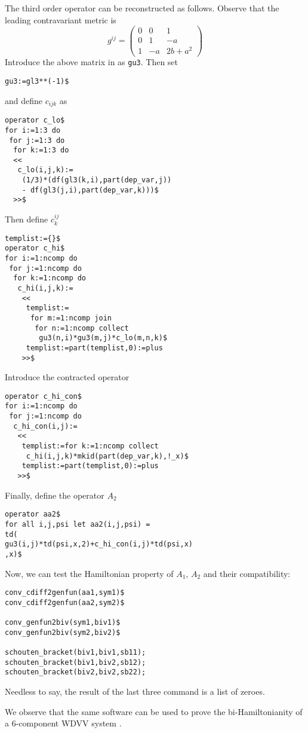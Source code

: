 The third order operator can be reconstructed as follows.
Observe that the leading contravariant metric is
\begin{displaymath}
  g^{ij}=
  \begin{pmatrix}
    0 & 0 & 1
    \\
    0 & 1 & -a
    \\
    1 & -a & 2b+a^2
  \end{pmatrix}
\end{displaymath}
Introduce the above matrix in \REDUCE as \texttt{gu3}. Then set
\begin{verbatim}
gu3:=gl3**(-1)$
\end{verbatim}
and define $c_{ijk}$ as
\begin{verbatim}
operator c_lo$
for i:=1:3 do
 for j:=1:3 do
  for k:=1:3 do
  <<
   c_lo(i,j,k):=
    (1/3)*(df(gl3(k,i),part(dep_var,j))
    - df(gl3(j,i),part(dep_var,k)))$
  >>$
\end{verbatim}
Then define $c^{ij}_k$
\begin{verbatim}
templist:={}$
operator c_hi$
for i:=1:ncomp do
 for j:=1:ncomp do
  for k:=1:ncomp do
   c_hi(i,j,k):=
    <<
     templist:=
      for m:=1:ncomp join
       for n:=1:ncomp collect
        gu3(n,i)*gu3(m,j)*c_lo(m,n,k)$
     templist:=part(templist,0):=plus
    >>$
\end{verbatim}
Introduce the contracted operator
\begin{verbatim}
operator c_hi_con$
for i:=1:ncomp do
 for j:=1:ncomp do
  c_hi_con(i,j):=
   <<
    templist:=for k:=1:ncomp collect
     c_hi(i,j,k)*mkid(part(dep_var,k),!_x)$
    templist:=part(templist,0):=plus
   >>$
\end{verbatim}
Finally, define the operator $A_2$
\begin{verbatim}
operator aa2$
for all i,j,psi let aa2(i,j,psi) =
td(
gu3(i,j)*td(psi,x,2)+c_hi_con(i,j)*td(psi,x)
,x)$
\end{verbatim}
Now, we can test the Hamiltonian property of $A_1$, $A_2$ and their
compatibility:
\begin{verbatim}
conv_cdiff2genfun(aa1,sym1)$
conv_cdiff2genfun(aa2,sym2)$

conv_genfun2biv(sym1,biv1)$
conv_genfun2biv(sym2,biv2)$

schouten_bracket(biv1,biv1,sb11);
schouten_bracket(biv1,biv2,sb12);
schouten_bracket(biv2,biv2,sb22);
\end{verbatim}
Needless to say, the result of the last three command is a list of zeroes.

We observe that the same software can be used to prove the bi-Hamiltonianity of
a $6$-component WDVV system \cite{PavlovVitolo:2015}.

